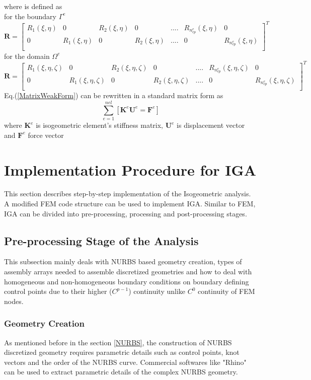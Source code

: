 \documentclass[12pt]{article}
\begin{document}
where  is defined as \\
for the boundary $\Gamma^e$ 
\begin{equation} \label{RMatrix1}
\textbf{R} =
\begin{bmatrix}
R_1(\xi,\eta) & 0 & R_2(\xi,\eta) &0 & .... & R_{n_{cp}^e}(\xi,\eta) & 0 \\
0 &R_1(\xi,\eta) & 0 & R_2(\xi,\eta) & .... & 0 & R_{n_{cp}^e}(\xi,\eta) \\
\end{bmatrix}^T
\end{equation}
for the domain $\Omega^e$
\begin{equation} \label{RMatrix2}
\textbf{R} =
\begin{bmatrix}
R_1(\xi,\eta,\zeta) & 0 & R_2(\xi,\eta,\zeta) &0 & .... & R_{n_{cp}^e}(\xi,\eta,\zeta) & 0 \\
0 &R_1(\xi,\eta,\zeta) & 0 & R_2(\xi,\eta,\zeta) & .... & 0 & R_{n_{cp}^e}(\xi,\eta,\zeta) \\
\end{bmatrix}^T
\end{equation}
Eq.(\ref{MatrixWeakForm}) can be rewritten in a standard matrix form as
\begin{equation}
\sum_{e=1}^{nel} [\textbf{K}^e \textbf{U}^e = \textbf{F}^e] 
\end{equation}
where $\textbf{K}^e$ is isogeometric element’s stiffness matrix, $\textbf{U}^e$ is displacement vector and $\textbf{F}^e$ force vector


\section{Implementation Procedure for IGA}
This section describes step-by-step implementation of the Isogeometric analysis. A modified FEM code structure can be used to implement IGA. Similar to FEM, IGA can be divided into pre-processing, processing and post-processing stages. 


\subsection{Pre-processing Stage of the Analysis}
This subsection mainly deals with NURBS based geometry creation, types of assembly arrays needed to assemble discretized geometries and how to deal with homogeneous and non-homogeneous boundary conditions on boundary defining control points due to their higher ($C^{p-1}$) continuity unlike $C^{0}$ continuity of FEM nodes.
\subsubsection{Geometry Creation}
As mentioned before in the section \ref{NURBS}, the construction of NURBS discretized geometry requires parametric details such as control points, knot vectors and the order of the NURBS curve. Commercial softwares like "Rhino" can be used to extract parametric details of the complex NURBS geometry. \\
\end{document}
